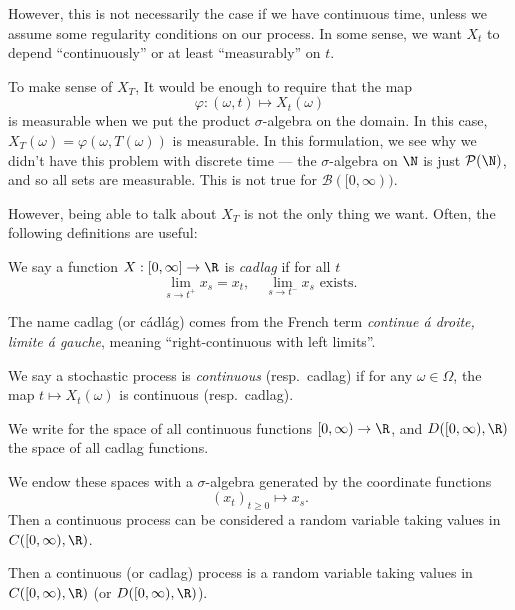 \documentclass[a4paper]{article}
\begin{document}
However, this is not necessarily the case if we have continuous time, unless we assume some regularity conditions on our process. In some sense, we want $X_t$ to depend ``continuously'' or at least ``measurably'' on $t$.

To make sense of $X_T$, It would be enough to require that the map
\[
  \varphi: (\omega, t) \mapsto X_t(\omega)
\]
is measurable when we put the product $\sigma$-algebra on the domain. In this case, $X_T(\omega) = \varphi(\omega, T(\omega))$ is measurable. In this formulation, we see why we didn't have this problem with discrete time --- the $\sigma$-algebra on $\N$ is just $\mathcal{P}(\N)$, and so all sets are measurable. This is not true for $\mathcal{B}([0, \infty))$.

However, being able to talk about $X_T$ is not the only thing we want. Often, the following definitions are useful:

\begin{defi}
  We say a function $X: [0, \infty] \to \R$ is \emph{cadlag} if for all $t$
  \[
    \lim_{s \to t^+} x_s = x_t,\quad \lim_{s \to t^-}x_s\text{ exists}.
  \]
\end{defi}
The name cadlag (or c\'adl\'ag) comes from the French term \emph{continue \'a droite, limite \'a gauche}, meaning ``right-continuous with left limits''.

\begin{defi}
  We say a stochastic process is \emph{continuous} (resp.\ cadlag) if for any $\omega \in \Omega$, the map $t \mapsto X_t (\omega)$ is continuous (resp.\ cadlag).
\end{defi}

\begin{notation}
  We write \term{$C([0, \infty), \R)$} for the space of all continuous functions $[0, \infty) \to \R$, and $D([0, \infty), \R)$ the space of all cadlag functions.\index{$C([0, \infty),\R)$}\index{$D([0, \infty), \R)$}

  We endow these spaces with a $\sigma$-algebra generated by the coordinate functions
  \[
    (x_t)_{t \geq 0} \mapsto x_s.
  \]
  Then a continuous process can be considered a random variable taking values in $C([0, \infty), \R)$.
\end{notation}

Then a continuous (or cadlag) process is a random variable taking values in $C([0, \infty), \R)$ (or $D([0, \infty), \R)$).
\end{document}
